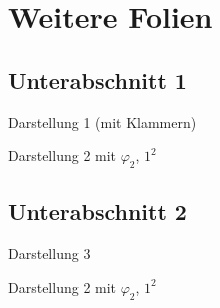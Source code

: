 \section{Weitere Folien}
\subsection{Unterabschnitt 1}
\begin{frame}{Darstellung 1 (mit Klammern)}
    \blindtext
\end{frame}

\begin{frame}{Darstellung 2 mit $\varphi_2$, $1^2$}
    \blindtext
\end{frame}

\subsection{Unterabschnitt 2}
\begin{frame}{Darstellung 3}
    \blindtext
\end{frame}

\begin{frame}[iace]{Darstellung 2 mit $\varphi_2$, $1^2$}
    \blindtext
\end{frame}


